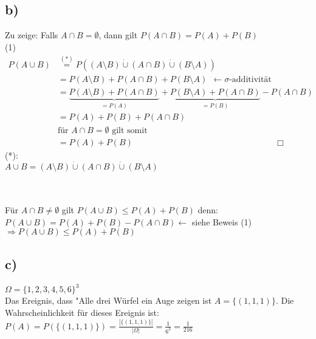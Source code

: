 \documentclass[a4paper]{scrartcl}
\begin{document}
\subsection*{b)}
Zu zeige: Falls $A \cap B = \emptyset$, dann gilt $P(A \cap B)=P(A)+P(B)$\\
(1)
\begin{align*}
P(A \cup B) &\overset{(*)}{=} P((A \setminus B) \dot\cup (A \cap B) \dot\cup (B \setminus A))\\
&= P(A \setminus B) + P(A \cap B) + P(B \setminus A) \ \ \leftarrow \sigma \textrm{-additivität}\\
&= \underbrace{P(A \setminus B) + P(A \cap B)}_{= P(A)} + \underbrace{P(B \setminus A) + P(A \cap B)}_{=P(B)} - P(A \cap B)\\
&= P(A) + P(B) + P(A \cap B)\\
&\textrm{für $A \cap B = \emptyset$ gilt somit}\\
&= P(A) + P(B) \hspace{7cm} \Box
\end{align*}
(*):\\
$A \cup B = (A \setminus B) \dot\cup (A \cap B) \dot\cup (B \setminus A)$\\

\\
\\
Für $A \cap B \neq \emptyset$ gilt $P(A \cup B) \le P(A)+P(B)$ denn:\\
$P(A \cup B)=P(A) +P(B) - P(A \cap B) \leftarrow$ siehe Beweis (1)\\
$\Rightarrow P(A \cup B) \le P(A)+P(B)$
\subsection*{c)}
$\Omega = \{1, 2, 3, 4, 5, 6\}^3$\\
Das Ereignis, dass "Alle drei Würfel ein Auge zeigen ist $A=\{(1, 1, 1)\}$. Die Wahrscheinlichkeit für dieses Ereignis ist: $P(A)=P(\{(1, 1, 1)\})=\frac{|\{(1, 1, 1)\}|}{|\Omega|}= \frac{1}{6^3}=\frac{1}{216}$
\end{document}
